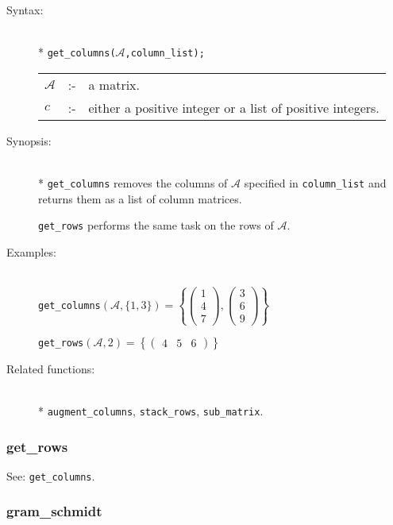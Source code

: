\begin{description}
\item[Syntax:]\mbox{}\\*
\texttt{get\_columns($\mathcal{A}$,column\_list);}\\[2mm]
\begin{tabular}{l l l}
$\mathcal{A}$ &:-& a matrix. \\
$c$          &:-& either a positive integer or a list of positive
                integers.
\end{tabular}

\item[Synopsis:]\mbox{}\\*
\texttt{get\_columns} removes the columns of $\mathcal{A}$ specified in
                \texttt{column\_list} and returns them as a list of column
                matrices.

 \texttt{get\_rows} performs the same task on the rows of
                $\mathcal{A}$.

\item[Examples:]\mbox{}\\
  \texttt{get\_columns}\((\mathcal{A},\{1,3\})  =
  \left\{
  \begin{pmatrix} 1 \\ 4 \\ 7 \end{pmatrix},
  \begin{pmatrix} 3 \\ 6 \\ 9 \end{pmatrix}
  \right\}\)

  \texttt{get\_rows}\((\mathcal{A},2)  =
  \left\{
  \begin{pmatrix} 4 & 5 & 6 \end{pmatrix}
  \right\}\)

\item[Related functions:]\mbox{}\\*
\texttt{augment\_columns}, \texttt{stack\_rows}, \texttt{sub\_matrix}.
\end{description}


\subsubsection{get\_rows}
\label{linalg:get_rows}
\hypertarget{operator:GET_ROWS}{}
See: \texttt{get\_columns}.


\subsubsection{gram\_schmidt}
\label{linalg:gram_schmidt}
\hypertarget{operator:GRAM_SCHMIDT}{}

